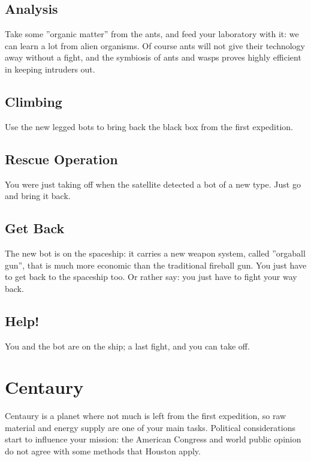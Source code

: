 \subsection{Analysis}

Take some ''organic matter'' from the ants, and feed your laboratory with it: we can learn a lot from alien
organisms. Of course ants will not give their technology away without a fight, and the symbiosis of ants and
wasps proves highly efficient in keeping intruders out.


\subsection{Climbing}

Use the new legged bots to bring back the black box from the first expedition.


\subsection{Rescue Operation}

You were just taking off when the satellite detected a bot of a new type. Just go and bring it back.


\subsection{Get Back}

The new bot is on the spaceship: it carries a new weapon system, called ''orgaball gun'', that is much more economic than the traditional fireball gun. You just have to get back to the spaceship too. Or rather say: you just have to fight your way back.


\subsection{Help!}

You and the bot are on the ship; a last fight, and you can take off.


\newpage
\section{Centaury}

Centaury is a planet where not much is left from the first expedition, so raw material and energy supply are one of your main tasks. Political considerations start to influence your mission: the American Congress and world public opinion do not agree with some methods that Houston apply.


